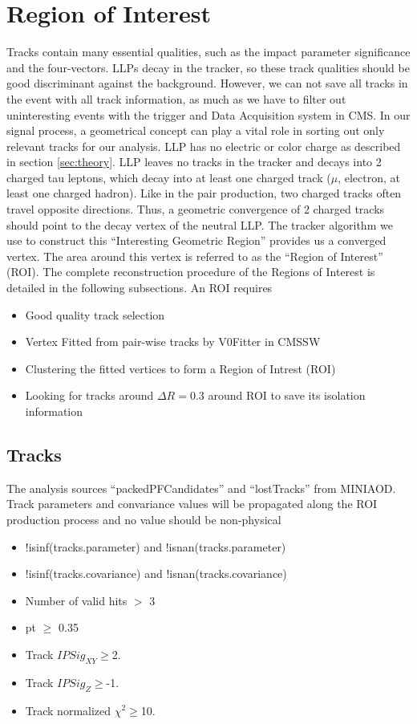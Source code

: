 \section{Region of Interest}\label{sec:ROIs}
Tracks contain many essential qualities, such as the impact parameter significance and the four-vectors.
LLPs decay in the tracker, so these track qualities should be good discriminant against the background.
However, we can not save all tracks in the event with all track information, as much as we have to filter out uninteresting events with the trigger and Data Acquisition system in CMS.
In our signal process, a geometrical concept can play a vital role in sorting out only relevant tracks for our analysis.
LLP has no electric or color charge as described in section \ref{sec:theory}.
LLP leaves no tracks in the tracker and decays into 2 charged tau leptons, which decay into at least one charged track ($\mu$, electron, at least one charged hadron).
Like in the pair production, two charged tracks often travel opposite directions.
Thus, a geometric convergence of 2 charged tracks should point to the decay vertex of the neutral LLP.
The tracker algorithm we use to construct this ``Interesting Geometric Region'' provides us a converged vertex.
The area around this vertex is referred to as the ``Region of Interest'' (ROI).
The complete reconstruction procedure of the Regions of Interest is detailed in the following subsections.
An ROI requires
\begin{itemize}
  \item Good quality track selection
  \item Vertex Fitted from pair-wise tracks by V0Fitter in CMSSW
  \item Clustering the fitted vertices to form a Region of Intrest (ROI)
  \item Looking for tracks around $\Delta R=0.3$ around ROI to save its isolation information
\end{itemize}

\subsection{Tracks}\label{sec:ROI_tracks}

The analysis sources ``packedPFCandidates'' and ``lostTracks'' from MINIAOD.
Track parameters and convariance values will be propagated along the ROI production process and no value should be non-physical
\begin{itemize}
  \item !isinf(tracks.parameter)  and !isnan(tracks.parameter) 
  \item !isinf(tracks.covariance) and !isnan(tracks.covariance) 
  \item Number of valid hits $>$ 3
  \item pt $\geq$ 0.35
  \item Track $IPSig_{XY}\geq$2.
  \item Track $IPSig_{Z}\geq$-1.
  \item Track normalized $\chi^{2}\geq$10.
\end{itemize}


